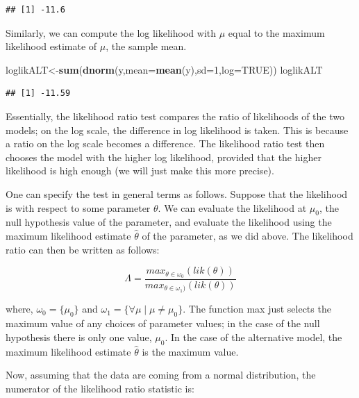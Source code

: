 \documentclass[12pt,]{krantz}
\newenvironment{Shaded}{\begin{snugshade}}{\end{snugshade}}
\newcommand{\DataTypeTok}[1]{\textcolor[rgb]{0.13,0.29,0.53}{#1}}
\newcommand{\DecValTok}[1]{\textcolor[rgb]{0.00,0.00,0.81}{#1}}
\newcommand{\KeywordTok}[1]{\textcolor[rgb]{0.13,0.29,0.53}{\textbf{#1}}}
\newcommand{\NormalTok}[1]{#1}
\newcommand{\OtherTok}[1]{\textcolor[rgb]{0.56,0.35,0.01}{#1}}
\begin{document}
\begin{verbatim}
## [1] -11.6
\end{verbatim}

Similarly, we can compute the log likelihood with \(\mu\) equal to the maximum likelihood estimate of \(\mu\), the sample mean.

\begin{Shaded}
\begin{Highlighting}[]
\NormalTok{loglikALT<-}\KeywordTok{sum}\NormalTok{(}\KeywordTok{dnorm}\NormalTok{(y,}\DataTypeTok{mean=}\KeywordTok{mean}\NormalTok{(y),}\DataTypeTok{sd=}\DecValTok{1}\NormalTok{,}\DataTypeTok{log=}\OtherTok{TRUE}\NormalTok{))}
\NormalTok{loglikALT}
\end{Highlighting}
\end{Shaded}

\begin{verbatim}
## [1] -11.59
\end{verbatim}

Essentially, the likelihood ratio test compares the ratio of likelihoods of the two models; on the log scale, the difference in log likelihood is taken. This is because a ratio on the log scale becomes a difference. The likelihood ratio test then chooses the model with the higher log likelihood, provided that the higher likelihood is high enough (we will just make this more precise).

One can specify the test in general terms as follows. Suppose that the likelihood is with respect to some parameter \(\theta\). We can evaluate the likelihood at \(\mu_0\), the null hypothesis value of the parameter, and evaluate the likelihood using the maximum likelihood estimate \(\hat\theta\) of the parameter, as we did above. The likelihood ratio can then be written as follows:

\begin{equation}
\Lambda = \frac{max_{\theta\in \omega_0}(lik(\theta))}{max_{\theta\in \omega_1)}(lik(\theta))}
\end{equation}

where, \(\omega_0=\{\mu_0\}\) and \(\omega_1=\{\forall \mu \mid \mu\neq \mu_0\}\). The function max just selects the maximum value of any choices of parameter values; in the case of the null hypothesis there is only one value, \(\mu_0\). In the case of the alternative model, the maximum likelihood estimate \(\hat\theta\) is the maximum value.

Now, assuming that the data are coming from a normal distribution, the numerator of the likelihood ratio statistic is:
\end{document}

